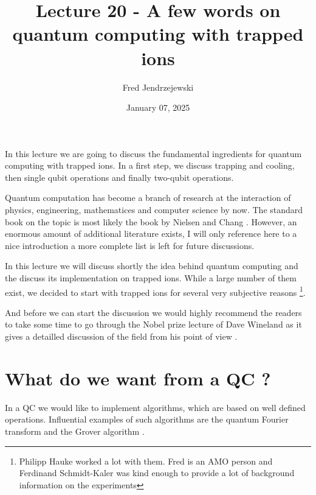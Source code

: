 \documentclass[10pt]{article}
\let\cite\citep
\renewenvironment{abstract}
  {{\bfseries\noindent{\abstractname}\par\nobreak}\footnotesize}
  {\bigskip}
\providecommand\citep{\cite}
\begin{document}
\title{Lecture 20 - A few words on quantum computing with trapped ions}



\author[1]{Fred Jendrzejewski}%
%


\vspace{-1em}



  
  \date{January 07, 2025}


\begingroup
\let\center\flushleft
\let\endcenter\endflushleft
\maketitle
\endgroup





\begin{abstract}
In this lecture we are going to discuss the fundamental ingredients for quantum computing with trapped ions. In a first step, we discuss trapping and cooling, then single qubit operations and finally two-qubit operations.%
\end{abstract}%



\sloppy


Quantum computation has become a branch of research at the interaction of physics, engineering, mathematices and computer science by now. The standard book on the topic is most likely the book by Nielsen and Chang \cite{Nielsen_2009}. However, an enormous amount of additional literature exists, I will only reference here to a nice introduction \cite{beginners} a more complete list is left for future discussions.


In this lecture we will discuss shortly the idea behind quantum computing and the discuss its implementation on trapped ions. While a large number of them exist, we decided to start with trapped ions for several very subjective reasons \footnote{Philipp Hauke worked a lot with them. Fred is an AMO person and Ferdinand Schmidt-Kaler was kind enough to provide a lot of background information on the experiments}.

And before we can start the discussion we would highly recommend the readers to take some time to go through the Nobel prize lecture of Dave Wineland as it gives a detailled discussion of the field from his point of view \cite{Wineland_2013}.

\section{What do we want from a QC ?}
In a QC we would like to implement algorithms, which are based on well defined operations. Influential examples of such algorithms are the quantum Fourier transform and the Grover algorithm \cite{beginners}. 
\end{document}
